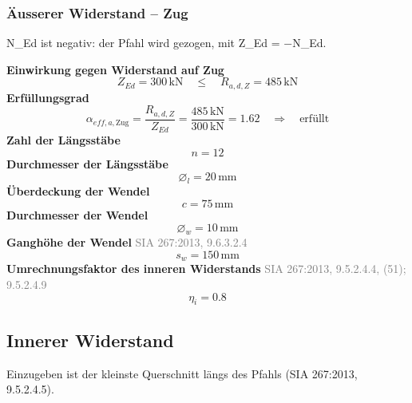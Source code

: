 \documentclass[11pt,a4paper]{article}
\newcommand{\normref}[1]{{\small\textcolor{gray}{#1}}}
\begin{document}
\subsubsection{Äusserer Widerstand – Zug}
N\_Ed ist negativ: der Pfahl wird gezogen, mit Z\_Ed = −N\_Ed.

\noindent\textbf{Einwirkung gegen Widerstand auf Zug}
\begin{equation*}
Z_{Ed} = 300\,\mathrm{kN} \quad \le \quad R_{a,d,Z} = 485\,\mathrm{kN}
\end{equation*}
\noindent\textbf{Erfüllungsgrad}
\begin{equation*}
\alpha_{eff,a,\text{Zug}} = \frac{R_{a,d,Z}}{Z_{Ed}} = \frac{485\,\mathrm{kN}}{300\,\mathrm{kN}} = 1.62 \quad \Rightarrow \quad \text{erfüllt}
\end{equation*}
\noindent\textbf{Zahl der Längsstäbe}
\begin{equation*}
n = 12
\end{equation*}
\noindent\textbf{Durchmesser der Längsstäbe}
\begin{equation*}
\varnothing_l = 20\,\mathrm{mm}
\end{equation*}
\noindent\textbf{Überdeckung der Wendel}
\begin{equation*}
c = 75\,\mathrm{mm}
\end{equation*}
\noindent\textbf{Durchmesser der Wendel}
\begin{equation*}
\varnothing_w = 10\,\mathrm{mm}
\end{equation*}
\noindent\textbf{Ganghöhe der Wendel} \hfill \normref{SIA 267:2013, 9.6.3.2.4}
\begin{equation*}
s_w = 150\,\mathrm{mm}
\end{equation*}
\noindent\textbf{Umrechnungsfaktor des inneren Widerstands} \hfill \normref{SIA 267:2013, 9.5.2.4.4, (51); 9.5.2.4.9}
\begin{equation*}
\eta_i = 0.8
\end{equation*}
\subsection{Innerer Widerstand}
Einzugeben ist der kleinste Querschnitt längs des Pfahls (SIA 267:2013, 9.5.2.4.5).
\end{document}
